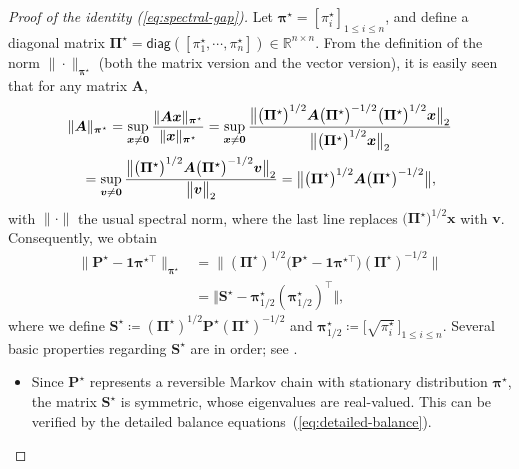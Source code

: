 \begin{proof}[Proof of the identity (\ref{eq:spectral-gap})]
%
Let $\bm{\pi}^{\star}=[\pi_i^{\star}]_{1\leq i\leq n}$, and define a diagonal matrix $\bm{\Pi}^{\star} = \mathsf{diag}([\pi_{1}^{\star}, \cdots, \pi_{n}^{\star}])\in\mathbb{R}^{n\times n}$.
%
%
From the definition of the norm $\|\cdot\|_{\bm{\pi}^{\star}}$ (both the matrix version and the vector version), it is easily seen that for any matrix $\bm{A}$,
%
\begin{align}
	& \|\bm{A}\|_{\bm{\pi}^{\star}}  =\sup_{\bm{x}\neq\bm{0}}\frac{\|\bm{A}\bm{x}\|_{\bm{\pi}^{\star}}}{\|\bm{x}\|_{\bm{\pi}^{\star}}}=\sup_{\bm{x}\neq\bm{0}}\frac{\big\|\big(\bm{\Pi}^{\star}\big)^{1/2}\bm{A}\big(\bm{\Pi}^{\star}\big)^{-1/2}\big(\bm{\Pi}^{\star}\big)^{1/2}\bm{x}\big\|_{2}}{\big\|\big(\bm{\Pi}^{\star}\big)^{1/2}\bm{x}\big\|_{2}} \notag\\
	& \quad =\sup_{\bm{v}\neq\bm{0}}\frac{\big\|\big(\bm{\Pi}^{\star}\big)^{1/2}\bm{A}\big(\bm{\Pi}^{\star}\big)^{-1/2}\bm{v}\big\|_{2}}{\big\|\bm{v}\big\|_{2}}=\big\|\big(\bm{\Pi}^{\star}\big)^{1/2}\bm{A}\big(\bm{\Pi}^{\star}\big)^{-1/2}\big\|,  \label{eq:pi-norm-matrix-equation}
\end{align}
%
with $\|\cdot\|$ the usual spectral norm,  where the last line replaces $\big(\bm{\Pi}^{\star}\big)^{1/2}\bm{x}$ with $\bm{v}$.
Consequently, we obtain
%
\begin{align*}
\|\bm{P}^{\star}-\bm{1}\bm{\pi}^{\star\top}\|_{\bm{\pi}^{\star}} & =\|\left(\bm{\Pi}^{\star}\right)^{1/2}\big(\bm{P}^{\star}-\bm{1}\bm{\pi}^{\star\top}\big)\left(\bm{\Pi}^{\star}\right)^{-1/2}\|\\
	& =\big\Vert \bm{S}^{\star}- \bm{\pi}^{\star}_{1/2}(\bm{\pi}^{\star}_{1/2})^{\top} \big\Vert ,
\end{align*}
%
where we define $\bm{S}^{\star}\coloneqq\left(\bm{\Pi}^{\star}\right)^{1/2}\bm{P}^{\star}\left(\bm{\Pi}^{\star}\right)^{-1/2}$ and $\bm{\pi}^{\star}_{1/2} \coloneqq \big[ \sqrt{\pi_i^{\star} } \, \big]_{1\leq i\leq n}$.
%
Several basic properties regarding $\bm{S}^{\star}$ are in order; see \citet[Chapter 6.2]{bremaud2013markov}.
%
\begin{itemize}
	\item[(a)] Since $\bm{P}^{\star}$ represents a reversible Markov chain with stationary distribution $\bm{\pi}^{\star}$,   			
		the matrix $\bm{S}^{\star}$ is symmetric, whose eigenvalues are real-valued. This can be verified by the detailed balance equations~(\ref{eq:detailed-balance}).

\end{itemize}
\end{proof}
